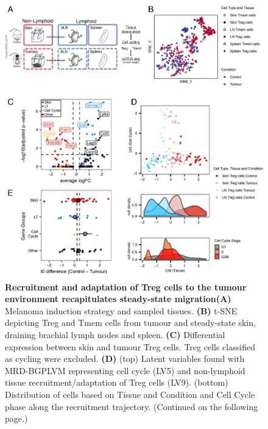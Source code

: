 \begin{figure}[pt] 
\centering    
\includegraphics[width=1.0\textwidth]{Chapter2/Figs/chap2_fig4.png} %
\caption[Recruitment and adaptation of Treg cells to the tumour environment recapitulates steady-state migration]{\textbf{Recruitment and adaptation of Treg cells to the tumour environment recapitulates steady-state migration}\newline\textbf{(A)} Melanoma induction strategy and sampled tissues. \textbf{(B)} t-SNE depicting Treg and Tmem cells from tumour and steady-state skin, draining brachial lymph nodes and spleen. \textbf{(C)} Differential expression between skin and tumour Treg cells. Treg cells classified as cycling were excluded. \textbf{(D)} (top) Latent variables found with MRD-BGPLVM representing cell cycle (LV5) and non-lymphoid tissue recruitment/adaptation of Treg cells (LV9). (bottom) Distribution of cells based on Tissue and Condition and Cell Cycle phase along the recruitment trajectory. (Continued on the following page.)}
\label{fig:chap2_fig4}
\end{figure}
\begin{figure}[t]
\end{figure}

